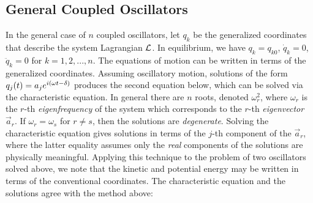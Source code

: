 \subsection{General Coupled Oscillators}
In the general case of $n$ coupled oscillators, let $q_k$ be the generalized coordinates that describe the system Lagrangian $\mathcal{L}$. In equilibrium, we have $q_k=q_{k0}$, $\dot{q}_k=0$, $\ddot{q}_k=0$ for $k=1,2,...,n$. 
The equations of motion can be written in terms of the generalized coordinates. Assuming oscillatory motion, solutions of the form $q_j (t)= a_j e^{i\left(\omega t - \delta\right)}$ produces the second equation below, which can be solved via the characteristic equation. 
In general there are $n$ roots, denoted $\omega^2_r$, where $\omega_r$ is the $r$-th \textit{eigenfrequency} of the system which corresponds to the $r$-th \textit{eigenvector} $\vec{a}_r$. If $\omega_r=\omega_s$ for $r\neq s$, then the solutions are \textit{degenerate}. Solving the characteristic equation gives solutions in terms of the $j$-th component of the $\vec{a}_r$, where the latter equality assumes only the \textit{real} components of the solutions are physically meaningful.
Applying this technique to the problem of two oscillators solved above, we note that the kinetic and potential energy may be written in terms of the conventional coordinates. The characteristic equation and the solutions agree with the method above:
